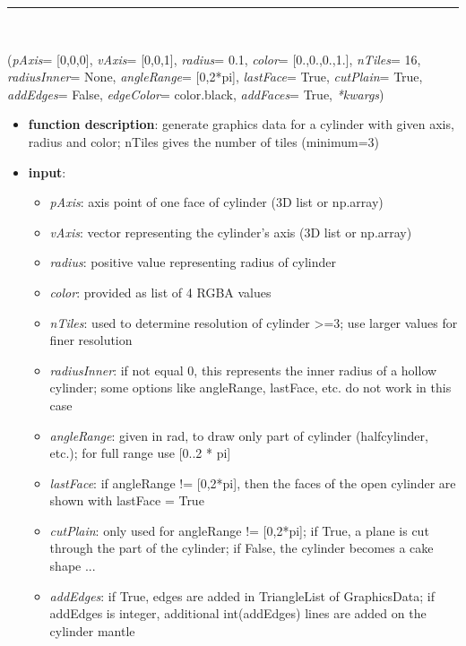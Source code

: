 \begin{itemize}[leftmargin=1.4cm]
\begin{itemize}[leftmargin=1.4cm]
\begin{itemize}[leftmargin=1.4cm]
\begin{itemize}[leftmargin=0.5cm]
\begin{itemize}[leftmargin=1.4cm]
\begin{itemize}[leftmargin=1.4cm]
\begin{itemize}[leftmargin=1.4cm]
\begin{itemize}[leftmargin=0.5cm]
\begin{itemize}[leftmargin=1.4cm]
%
\noindent\rule{8cm}{0.75pt}\vspace{1pt} \\ 
\begin{flushleft}
\label{sec:graphics:Cylinder}
({\it pAxis}= [0,0,0], {\it vAxis}= [0,0,1], {\it radius}= 0.1, {\it color}= [0.,0.,0.,1.], {\it nTiles}= 16, {\it radiusInner}= None, {\it angleRange}= [0,2*pi], {\it lastFace}= True, {\it cutPlain}= True, {\it addEdges}= False, {\it edgeColor}= color.black, {\it addFaces}= True, {\it **kwargs})
\end{flushleft}
\setlength{\itemindent}{0.7cm}
\begin{itemize}[leftmargin=0.7cm]
\item[--]
{\bf function description}: generate graphics data for a cylinder with given axis, radius and color; nTiles gives the number of tiles (minimum=3)
\item[--]
{\bf input}: \vspace{-6pt}
\begin{itemize}[leftmargin=1.2cm]
\setlength{\itemindent}{-0.7cm}
\item[]{\it pAxis}: axis point of one face of cylinder (3D list or np.array)
\item[]{\it vAxis}: vector representing the cylinder's axis (3D list or np.array)
\item[]{\it radius}: positive value representing radius of cylinder
\item[]{\it color}: provided as list of 4 RGBA values
\item[]{\it nTiles}: used to determine resolution of cylinder >=3; use larger values for finer resolution
\item[]{\it radiusInner}: if not equal 0, this represents the inner radius of a hollow cylinder; some options like angleRange, lastFace, etc. do not work in this case
\item[]{\it angleRange}: given in rad, to draw only part of cylinder (halfcylinder, etc.); for full range use [0..2 * pi]
\item[]{\it lastFace}: if angleRange != [0,2*pi], then the faces of the open cylinder are shown with lastFace = True
\item[]{\it cutPlain}: only used for angleRange != [0,2*pi]; if True, a plane is cut through the part of the cylinder; if False, the cylinder becomes a cake shape ...
\item[]{\it addEdges}: if True, edges are added in TriangleList of GraphicsData; if addEdges is integer, additional int(addEdges) lines are added on the cylinder mantle

\end{itemize}
\end{itemize}
\end{itemize}
\end{itemize}
\end{itemize}
\end{itemize}
\end{itemize}
\end{itemize}
\end{itemize}
\end{itemize}
\end{itemize}
